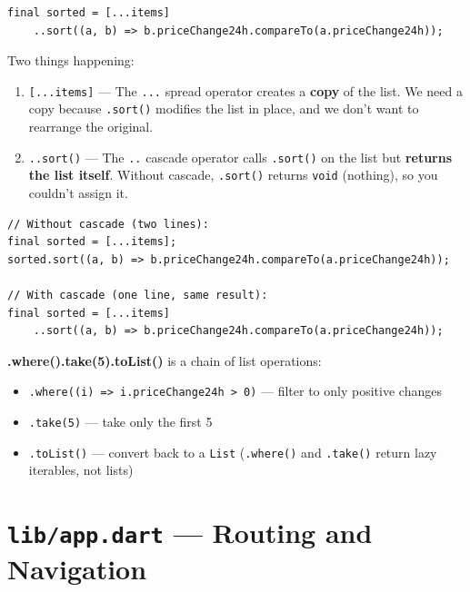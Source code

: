 \documentclass[11pt, a4paper]{article}
\begin{document}
\begin{conceptbox}[title=\textbf{Spread [...items] and Cascade ..sort()}]

\begin{lstlisting}[numbers=none]
final sorted = [...items]
    ..sort((a, b) => b.priceChange24h.compareTo(a.priceChange24h));
\end{lstlisting}

Two things happening:
\begin{enumerate}
    \item \texttt{[...items]} --- The \texttt{...} spread operator creates a \textbf{copy} of the list. We need a copy because \texttt{.sort()} modifies the list in place, and we don't want to rearrange the original.
    \item \texttt{..sort()} --- The \texttt{..} cascade operator calls \texttt{.sort()} on the list but \textbf{returns the list itself}. Without cascade, \texttt{.sort()} returns \texttt{void} (nothing), so you couldn't assign it.
\end{enumerate}

\begin{lstlisting}[numbers=none]
// Without cascade (two lines):
final sorted = [...items];
sorted.sort((a, b) => b.priceChange24h.compareTo(a.priceChange24h));

// With cascade (one line, same result):
final sorted = [...items]
    ..sort((a, b) => b.priceChange24h.compareTo(a.priceChange24h));
\end{lstlisting}
\end{conceptbox}

\textbf{.where().take(5).toList()} is a chain of list operations:
\begin{itemize}
    \item \texttt{.where((i) => i.priceChange24h > 0)} --- filter to only positive changes
    \item \texttt{.take(5)} --- take only the first 5
    \item \texttt{.toList()} --- convert back to a \texttt{List} (\texttt{.where()} and \texttt{.take()} return lazy iterables, not lists)
\end{itemize}

\newpage

\section{\texttt{lib/app.dart} --- Routing and Navigation}
\end{document}
